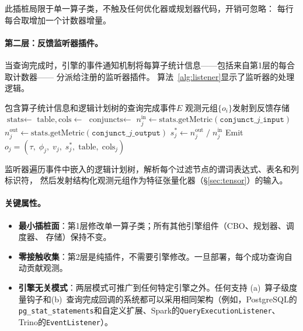 \documentclass[runningheads]{llncs}
\begin{document}
此插桩局限于单一算子类，不触及任何优化器或规划器代码，开销可忽略：
每行每合取增加一个计数器增量。

\paragraph{第二层：反馈监听器插件。}
当查询完成时，引擎的事件通知机制将每算子统计信息——包括来自第1层的每合取计数器——
分派给注册的监听器插件。
算法~\ref{alg:listener}显示了监听器的处理逻辑。

\begin{algorithm}[t]
\caption{反馈监听器插件}
\label{alg:listener}
\begin{algorithmic}[1]
\Require 包含算子统计信息和逻辑计划树的查询完成事件$E$
\Ensure  观测元组$\{o_i\}$发射到反馈存储
    \State $\text{stats} \leftarrow$ 
    \State $\text{table}, \text{cols} \leftarrow$ 
    \State $\text{conjuncts} \leftarrow$ 
      \State $n^{\text{in}}_j \leftarrow \text{stats.getMetric}(\texttt{conjunct\_}j\texttt{\_input})$
      \State $n^{\text{out}}_j \leftarrow \text{stats.getMetric}(\texttt{conjunct\_}j\texttt{\_output})$
      \State $s^*_j \leftarrow n^{\text{out}}_j \;/\; n^{\text{in}}_j$
      \State Emit $o_j = (\tau,\; \phi_j,\; v_j,\; s^*_j,\; \text{table},\; \text{cols}_j)$
    \EndFor
  \EndFor
\EndProcedure
\end{algorithmic}
\end{algorithm}

监听器遍历事件中嵌入的逻辑计划树，解析每个过滤节点的谓词表达式、表名和列标识符，
然后发射结构化观测元组作为特征张量化器（\S\ref{sec:tensor}）的输入。

\paragraph{关键属性。}
\begin{itemize}
  \item \textbf{最小插桩面}：第1层修改单一算子类；所有其他引擎组件（CBO、规划器、调度器、
        存储）保持不变。
  \item \textbf{零接触收集}：第2层是纯插件，不需要引擎修改。一旦部署，每个成功查询自动贡献观测。
  \item \textbf{引擎无关模式}：两层模式可推广到任何特定引擎之外。任何支持
        (a)~算子级度量钩子和(b)~查询完成回调的系统都可以采用相同架构（例如，PostgreSQL的
        \texttt{pg\_stat\_statements}和自定义扩展、Spark的\texttt{QueryExecutionListener}、
        Trino的\texttt{EventListener}）。
\end{itemize}
\end{document}
